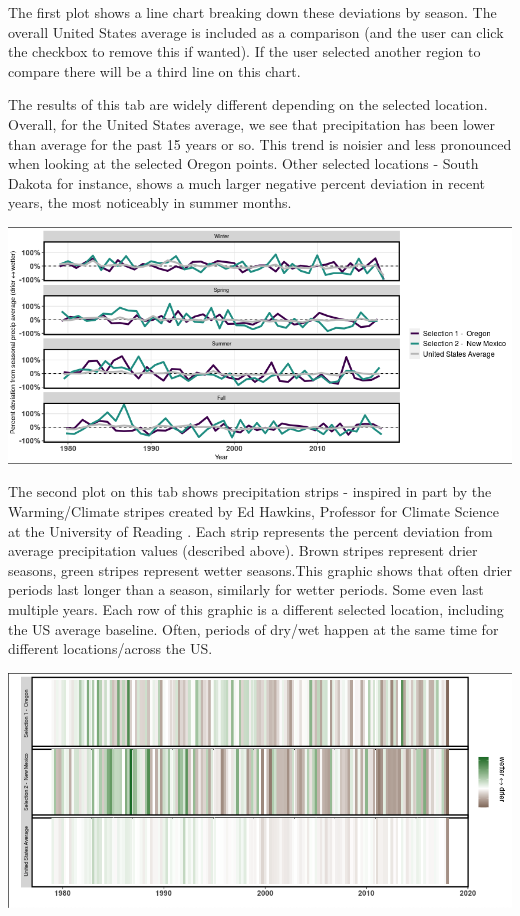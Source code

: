 \documentclass[10pt,letterpaper]{article}
\begin{document}
The first plot shows a line chart breaking down these deviations by season. The overall United States average is included as a comparison (and the user can click the checkbox to remove this if wanted). If the user selected another region to compare there will be a third line on this chart.


The results of this tab are widely different depending on the selected location. Overall, for the United States average, we see that precipitation has been lower than average for the past 15 years or so. This trend is noisier and less pronounced when looking at the selected Oregon points. Other selected locations - South Dakota for instance, shows a much larger negative percent deviation in recent years, the most noticeably in summer months.

\begin{center}
  \includegraphics[width = .8\textwidth]{graphics/seasonal_deviation}
\end{center}

The second plot on this tab shows precipitation strips - inspired in part by the Warming/Climate stripes created by Ed Hawkins, Professor for Climate Science at the University of Reading \cite{hawkins}. Each strip represents the percent deviation from average precipitation values (described above). Brown stripes represent drier seasons, green stripes represent wetter seasons.This graphic shows that often drier periods last longer than a season, similarly for wetter periods. Some even last multiple years. Each row of this graphic is a different selected location, including the US average baseline. Often, periods of dry/wet happen at the same time for different locations/across the US.

\begin{center}
  \includegraphics[width = .8\textwidth]{graphics/precipitation_strips}
\end{center}
\end{document}
